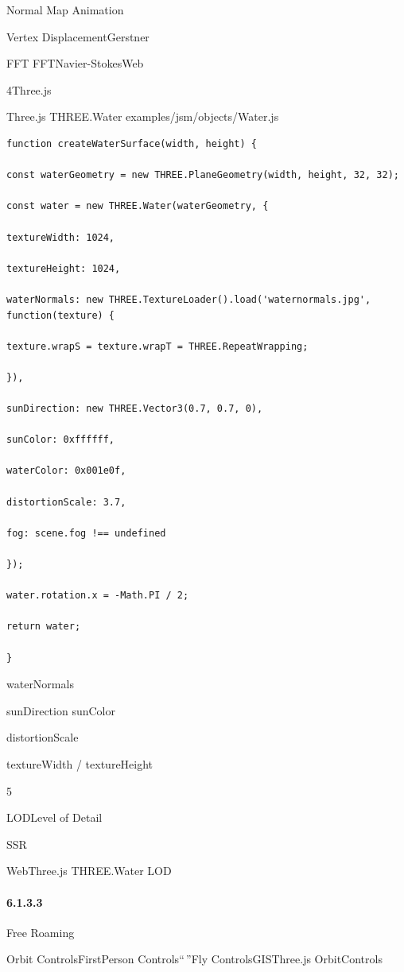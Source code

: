 Normal Map Animation

Vertex DisplacementGerstner

FFT FFTNavier-StokesWeb

4Three.js

Three.js THREE.Water examples/jsm/objects/Water.js

\begin{lstlisting}[style=javascript]
function createWaterSurface(width, height) {

const waterGeometry = new THREE.PlaneGeometry(width, height, 32, 32);

const water = new THREE.Water(waterGeometry, {

textureWidth: 1024,

textureHeight: 1024,

waterNormals: new THREE.TextureLoader().load('waternormals.jpg', function(texture) {

texture.wrapS = texture.wrapT = THREE.RepeatWrapping;

}),

sunDirection: new THREE.Vector3(0.7, 0.7, 0),

sunColor: 0xffffff,

waterColor: 0x001e0f,

distortionScale: 3.7,

fog: scene.fog !== undefined

});

water.rotation.x = -Math.PI / 2;

return water;

}
\end{lstlisting}

waterNormals

sunDirection sunColor

distortionScale

textureWidth / textureHeight

5

LODLevel of Detail

SSR

WebThree.js THREE.Water LOD

\hypertarget{section-29}{%
\paragraph{6.1.3.3}\label{section-29}}

Free Roaming

Orbit ControlsFirstPerson Controls``\,''Fly ControlsGISThree.js
OrbitControls

